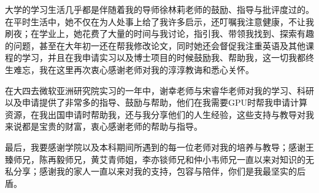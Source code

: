 \begin{acknowledgements}

大学的学习生活几乎都是伴随着我的导师徐林莉老师的鼓励、指导与批评度过的。在平时生活中，她不仅在为人处事上给了我许多启示，还叮嘱我注意健康，不让我刷夜；在学业上，她花费了大量的时间与我讨论，指引我、带领我找到、探索有趣的问题，甚至在大年初一还在帮我修改论文，同时她还会督促我注重英语及其他课程的学习，并且在我申请实习以及博士项目的时候鼓励我、帮助我，这一切我都终生难忘，我在这里再次衷心感谢老师对我的淳淳教诲和悉心关怀。

在大四去微软亚洲研究院实习的一年中，谢幸老师与宋睿华老师对我的学习、科研以及申请提供了非常多的指导、鼓励与帮助，他们在我需要GPU时帮我申请计算资源，在我出国申请时帮助我，还与我分享他们的人生经验，这些支持与教导对我来说都是宝贵的财富，衷心感谢老师的帮助与指导。

最后，我要感谢学院以及本科期间所遇到的每一位老师对我的培养与教导；感谢王臻师兄，陈再毅师兄，黄艾青师姐，李亦锬师兄和仲小韦师兄一直以来对知识的无私分享；感谢我的家人一直以来对我的支持，包容与陪伴，你们是我最坚实的后盾。

\end{acknowledgements}

